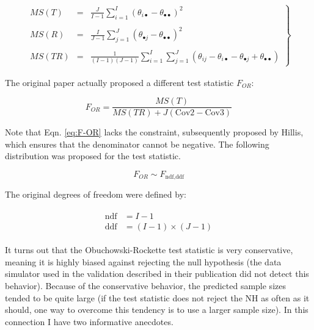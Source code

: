\documentclass[
]{book}
\begin{document}
\begin{align}
\left.\begin{array}{rcl}
MS(T)&=&\frac{J}{I-1}\sum_{i=1}^{I}(\theta_{i\bullet}-\theta_{\bullet\bullet})^2\\
\\ 
MS(R)&=&\frac{I}{J-1}\sum_{j=1}^{J}(\theta_{\bullet j}-\theta_{\bullet\bullet})^2\\
\\
MS(TR)&=&\frac{1}{(I-1)(J-1)}\sum_{i=1}^{I}\sum_{j=1}^{J}(\theta_{ij}-\theta_{i\bullet}-\theta_{\bullet j}+\theta_{\bullet\bullet})
\end{array}\right\}
\label{eq:MS-OR}
\end{align}

The original paper \citep{RN1450} actually proposed a different test statistic \(F_{OR}\):

\begin{equation}
F_{OR}=\frac{MS(T)}{MS(TR)+J(\text{Cov2}-\text{Cov3})}
\label{eq:F-OR}
\end{equation}

Note that Eqn. \eqref{eq:F-OR} lacks the constraint, subsequently proposed by Hillis, which ensures that the denominator cannot be negative. The following distribution was proposed for the test statistic.

\begin{equation}
F_{OR}\sim F_{\text{ndf},\text{ddf}}
\label{eq:SamplingDistr-F-OR}
\end{equation}

The original degrees of freedom were defined by:

\begin{align}
\begin{split}
\text{ndf}&=I-1\\
\text{ddf}&=(I-1)\times(J-1)
\end{split}
\label{eq:ORdegreesOfFreedom}
\end{align}

It turns out that the Obuchowski-Rockette test statistic is very conservative, meaning it is highly biased against rejecting the null hypothesis (the data simulator used in the validation described in their publication did not detect this behavior). Because of the conservative behavior, the predicted sample sizes tended to be quite large (if the test statistic does not reject the NH as often as it should, one way to overcome this tendency is to use a larger sample size). In this connection I have two informative anecdotes.
\end{document}
